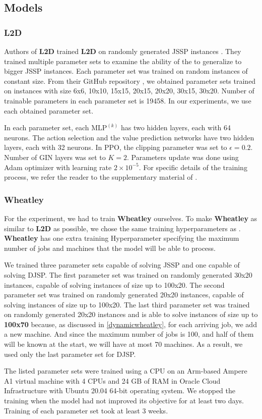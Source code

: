 \subsection{Models}
\subsubsection{L2D}
Authors of \textbf{L2D} trained \textbf{L2D} on randomly generated JSSP instances \cite{zhang2020learning}. They trained multiple parameter sets to examine the ability of the  to generalize to bigger JSSP instances. Each parameter set was trained on random instances of constant size. From their GitHub repository \cite{github_l2d}, we obtained parameter sets trained on instances with size 6x6, 10x10, 15x15, 20x15, 20x20, 30x15, 30x20. Number of trainable parameters in each parameter set is 19458. In our experiments, we use each obtained parameter set. 
\par
In each parameter set, each $\text{MLP}^{(k)}$ has two hidden layers, each with 64 neurons. The action selection and the value prediction networks have two hidden layers, each with 32 neurons. In PPO, the clipping parameter was set to $\epsilon = 0.2$. Number of GIN layers was set to $K = 2$. Parameters update was done using Adam optimizer with learning rate $2\times10^{-5}$. For specific details of the training process, we refer the reader to the supplementary material of \cite{zhang2020learning}.

\subsubsection{Wheatley}
For the experiment, we had to train \textbf{Wheatley} ourselves. To make \textbf{Wheatley} as similar to \textbf{L2D} as possible, we chose the same training hyperparameters as . \textbf{Wheatley} has one extra training Hyperparameter specifying the maximum number of jobs and machines that the model will be able to process. 
\par
We trained three parameter sets capable of solving JSSP and one capable of solving DJSP. The first parameter set was trained on randomly generated 30x20 instances, capable of solving instances of size up to 100x20. The second parameter set was trained on randomly generated 20x20 instances, capable of solving instances of size up to 100x20. The last third parameter set was trained on randomly generated 20x20 instances and is able to solve instances of size up to \textbf{100x70} because, as discussed in \ref{dynamicwheatley}, for each arriving job, we add a new machine. And since the maximum number of jobs is 100, and half of them will be known at the start, we will have at most 70 machines. As a result, we used only the last parameter set for DJSP.
\par
The listed parameter sets were trained using a CPU on an Arm-based Ampere A1 virtual machine with 4 CPUs and 24 GB of RAM in Oracle Cloud Infrastructure with Ubuntu 20.04 64-bit operating system. We stopped the training when the model had not improved its objective for at least two days. Training of each parameter set took at least 3 weeks.

